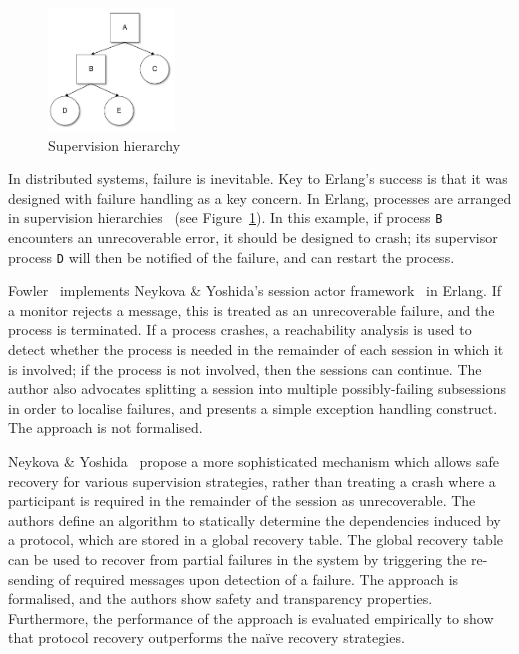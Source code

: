 \documentclass[
graybox,
envcountchap
]{svmult}
\begin{document}
\begin{bibunit}
  \begin{figure}
    \centering
    \includegraphics[width=0.3\textwidth]{img/SupervisionTree.pdf}
    \caption{Supervision hierarchy}
    \label{fig:bt:supervision}
  \end{figure}

  In distributed systems, failure is inevitable. Key to Erlang's success is that
  it was  designed with failure handling as a key concern. In Erlang, processes
  are arranged in supervision hierarchies~\cite{Armstrong03:thesis} (see
  Figure~\ref{fig:bt:supervision}). In this example, if process \texttt{B}
  encounters an unrecoverable error, it should be designed to crash; its
  supervisor process \texttt{D} will then be notified of the failure, and can
  restart the process.

  Fowler~\cite{Fowler16:actors} implements Neykova \& Yoshida's session actor
  framework~\cite{NeykovaY16:sactor} in Erlang. If a monitor rejects a message,
  this is treated as an unrecoverable failure, and the process is terminated.
  If a process crashes, a reachability analysis is used to detect whether the
  process is needed in the remainder of each session in which it is involved; if
  the process is not involved, then the sessions can continue. The author also
  advocates splitting a session into multiple possibly-failing subsessions in
  order to localise failures, and presents a simple exception handling
  construct. The approach is not formalised.

  Neykova \& Yoshida~\cite{NeykovaY17:let-it-recover} propose a more
  sophisticated mechanism which allows safe recovery for various supervision
  strategies, rather than treating a crash where a participant is required in
  the remainder of the session as unrecoverable. The authors define an algorithm
  to statically determine the dependencies induced by a protocol, which are
  stored in a global recovery table. The global recovery table can be used to
  recover from partial failures in the system by triggering the re-sending of
  required messages upon detection of a failure. The approach is formalised, and
  the authors show safety and transparency properties. Furthermore, the
  performance of the approach is evaluated empirically to show that protocol
  recovery outperforms the na\"ive recovery strategies.


\end{bibunit}
\end{document}
